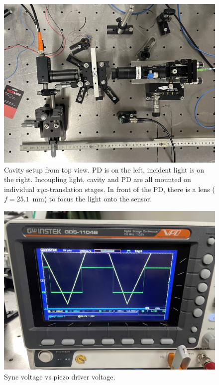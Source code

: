 \documentclass[a4paper,11pt]{article}
\begin{document}
\begin{figure}[htbp]
    \centering
    \includegraphics[width=\textwidth]{IMG_8999.jpg}
    \caption{Cavity setup from top view. PD is on the left, incident light is on the right. Incoupling light, cavity and PD are all mounted on individual $xyz$-translation stages. In front of the PD, there is a lens ($f=25.1$~mm) to focus the light onto the sensor.}
    \label{fig:setup}
\end{figure}

\begin{figure}[htbp]
    \centering
    \includegraphics[width=\textwidth]{osci.jpeg}
    \caption{Sync voltage vs piezo driver voltage.}
    \label{fig:osci}
\end{figure}
\end{document}
